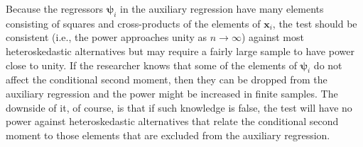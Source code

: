 Because the regressors $\bm{\psi}_i$ in the auxiliary regression have many elements
consisting of squares and cross-products of the elements of $\mathbf{x}_i$, the test
should be consistent (i.e., the power approaches unity as $n \to \infty$) against most
heteroskedastic alternatives but may require a fairly large sample to have power close to
unity.  If the researcher knows that some of the elements of $\bm{\psi}_i$ do not affect
the conditional second moment, then they can be dropped from the auxiliary regression and
the power might be increased in finite samples.  The downside of it, of course, is that
if such knowledge is false, the test will have no power against heteroskedastic
alternatives that relate the conditional second moment to those elements that are excluded
from the auxiliary regression.

